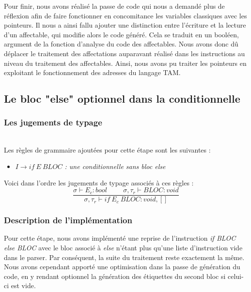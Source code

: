 \documentclass{article}
\begin{document}
Pour finir, nous avons réalisé la passe de code qui nous a demandé plus de réflexion afin de faire fonctionner en concomitance les variables classiques avec les pointeurs. Il nous a ainsi fallu ajouter une distinction entre l'écriture et la lecture d'un affectable, qui modifie alors le code généré. Cela se traduit en un booléen, argument de la fonction d'analyse du code des affectables. Nous avons donc dû déplacer le traitement des affectations auparavant réalisé dans les instructions au niveau du traitement des affectables. Ainsi, nous avons pu traiter les pointeurs en exploitant le fonctionnement des adresses du langage TAM.




\newpage
\subsection{Le bloc "else" optionnel dans la conditionnelle}
\subsubsection{Les jugements de typage}
\ \\
Les règles de grammaire ajoutées pour cette étape sont les suivantes :

\begin{itemize}[label=\textbullet, font=\LARGE \color{black},leftmargin=1cm]
    \item $I \xrightarrow{} if\ E\ BLOC$ \textit{: une conditionnelle sans bloc else}
\end{itemize}
\hbox{}
Voici dans l'ordre les jugements de typage associés à ces règles :\hbox{}
\begin{equation}
\frac {
    \sigma\vdash E_c:bool       \hspace{1cm}
    \sigma,\tau_r\vdash BLOC:void
}
{\sigma,\tau_r\vdash if\ E_c\ BLOC:void,[]}
\end{equation}

\subsubsection{Description de l'implémentation}
Pour cette étape, nous avons implémenté une reprise de l'instruction \textit{if BLOC else BLOC} avec le bloc associé à \textit{else} n'étant plus qu'une liste d'instruction vide dans le parser. Par conséquent, la suite du traitement reste exactement la même. Nous avons cependant apporté une optimisation dans la passe de génération du code, en y rendant optionnel la génération des étiquettes du second bloc si celui-ci est vide.
\end{document}
